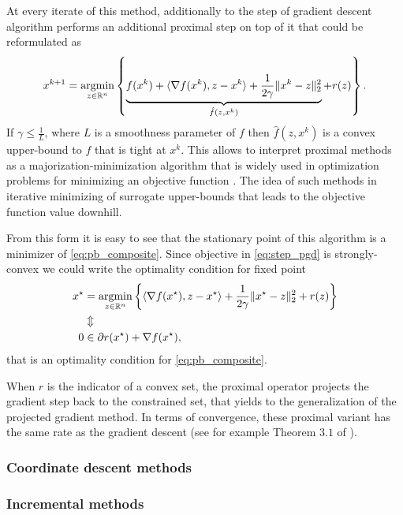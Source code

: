 At every iterate of this method, additionally to the step of gradient descent algorithm performs an additional proximal step on top of it that could be reformulated as
\begin{equation}\label{eq:step_pgd}
x^{k+1} = \operatorname*{argmin}_{z\in\mathbb{R}^n}\left\{\underbrace{f(x^k) + \langle\nabla f(x^k), z-x^k\rangle+\frac{1}{2\gamma}\|x^k-z\|_2^2}_{\hat{f}(z, x^k)} + r(z)\right\}.
\end{equation}
If $\gamma\leq \frac{1}{L}$, where $L$ is a smoothness parameter of $f$ then $\hat{f}(z, x^k)$ is a convex upper-bound to $f$ that is tight at $x^k$. This allows to interpret proximal methods as a majorization-minimization algorithm \cite{lange2000optimization} {that is widely used in optimization problems for minimizing an objective function \cite{cappe2009line, neal1998view,gasso2009recovering,wright2009sparse,mairal2015incremental}. The idea of such methods in iterative minimizing of surrogate upper-bounds that leads to the objective function value downhill.}

From this form it is easy to see that the stationary point of this algorithm is a minimizer of \eqref{eq:pb_composite}. Since objective in \eqref{eq:step_pgd} is strongly-convex we could write the optimality condition for fixed point
\begin{align*}
x^\star &= \operatorname*{argmin}_{z\in\mathbb{R}^n}\left\{\langle\nabla f(x^\star), z-x^\star\rangle+\frac{1}{2\gamma}\|x^\star-z\|_2^2 + r(z)\right\}\\
&\Updownarrow\\
0&\in \partial r(x^\star) + \nabla f(x^\star),
\end{align*}
that is an optimality condition for \eqref{eq:pb_composite}.

When $r$ is the indicator of a convex set, the proximal operator projects the gradient step back to the constrained set, that yields to the generalization of the projected gradient method. In terms of convergence, these proximal variant has the same rate as the gradient descent (see for example Theorem $3.1$ of \cite{beck2009fast}).

\subsubsection{Coordinate descent methods}


\subsubsection{Incremental methods}
